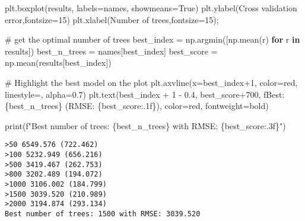 \documentclass[
  letterpaper,
  DIV=11,
  numbers=noendperiod]{scrreprt}
\newenvironment{Shaded}{\begin{snugshade}}{\end{snugshade}}
\newcommand{\BuiltInTok}[1]{\textcolor[rgb]{0.00,0.23,0.31}{#1}}
\newcommand{\CommentTok}[1]{\textcolor[rgb]{0.37,0.37,0.37}{#1}}
\newcommand{\ControlFlowTok}[1]{\textcolor[rgb]{0.00,0.23,0.31}{\textbf{#1}}}
\newcommand{\DecValTok}[1]{\textcolor[rgb]{0.68,0.00,0.00}{#1}}
\newcommand{\FloatTok}[1]{\textcolor[rgb]{0.68,0.00,0.00}{#1}}
\newcommand{\KeywordTok}[1]{\textcolor[rgb]{0.00,0.23,0.31}{\textbf{#1}}}
\newcommand{\NormalTok}[1]{\textcolor[rgb]{0.00,0.23,0.31}{#1}}
\newcommand{\OperatorTok}[1]{\textcolor[rgb]{0.37,0.37,0.37}{#1}}
\newcommand{\SpecialCharTok}[1]{\textcolor[rgb]{0.37,0.37,0.37}{#1}}
\newcommand{\SpecialStringTok}[1]{\textcolor[rgb]{0.13,0.47,0.30}{#1}}
\newcommand{\StringTok}[1]{\textcolor[rgb]{0.13,0.47,0.30}{#1}}
\newcommand{\VariableTok}[1]{\textcolor[rgb]{0.07,0.07,0.07}{#1}}
\begin{document}
\begin{Shaded}
\begin{Highlighting}[]
\NormalTok{plt.boxplot(results, labels}\OperatorTok{=}\NormalTok{names, showmeans}\OperatorTok{=}\VariableTok{True}\NormalTok{)}
\NormalTok{plt.ylabel(}\StringTok{\textquotesingle{}Cross validation error\textquotesingle{}}\NormalTok{,fontsize}\OperatorTok{=}\DecValTok{15}\NormalTok{)}
\NormalTok{plt.xlabel(}\StringTok{\textquotesingle{}Number of trees\textquotesingle{}}\NormalTok{,fontsize}\OperatorTok{=}\DecValTok{15}\NormalTok{)}\OperatorTok{;}

\CommentTok{\# get the optimal number of trees}
\NormalTok{best\_index }\OperatorTok{=}\NormalTok{ np.argmin([np.mean(r) }\ControlFlowTok{for}\NormalTok{ r }\KeywordTok{in}\NormalTok{ results])}
\NormalTok{best\_n\_trees }\OperatorTok{=}\NormalTok{ names[best\_index]}
\NormalTok{best\_score }\OperatorTok{=}\NormalTok{ np.mean(results[best\_index])}


\CommentTok{\# Highlight the best model on the plot}
\NormalTok{plt.axvline(x}\OperatorTok{=}\NormalTok{best\_index}\OperatorTok{+}\DecValTok{1}\NormalTok{, color}\OperatorTok{=}\StringTok{\textquotesingle{}red\textquotesingle{}}\NormalTok{, linestyle}\OperatorTok{=}\StringTok{\textquotesingle{}{-}{-}\textquotesingle{}}\NormalTok{, alpha}\OperatorTok{=}\FloatTok{0.7}\NormalTok{)}
\NormalTok{plt.text(best\_index }\OperatorTok{+} \DecValTok{1} \OperatorTok{{-}} \FloatTok{0.4}\NormalTok{, best\_score}\OperatorTok{+}\DecValTok{700}\NormalTok{, }
         \SpecialStringTok{f\textquotesingle{}Best: }\SpecialCharTok{\{}\NormalTok{best\_n\_trees}\SpecialCharTok{\}}\SpecialStringTok{ (RMSE: }\SpecialCharTok{\{}\NormalTok{best\_score}\SpecialCharTok{:.1f\}}\SpecialStringTok{)\textquotesingle{}}\NormalTok{, }
\NormalTok{         color}\OperatorTok{=}\StringTok{\textquotesingle{}red\textquotesingle{}}\NormalTok{, fontweight}\OperatorTok{=}\StringTok{\textquotesingle{}bold\textquotesingle{}}\NormalTok{)}

\BuiltInTok{print}\NormalTok{(}\SpecialStringTok{f"Best number of trees: }\SpecialCharTok{\{}\NormalTok{best\_n\_trees}\SpecialCharTok{\}}\SpecialStringTok{ with RMSE: }\SpecialCharTok{\{}\NormalTok{best\_score}\SpecialCharTok{:.3f\}}\SpecialStringTok{"}\NormalTok{)}
\end{Highlighting}
\end{Shaded}

\begin{verbatim}
>50 6549.576 (722.462)
>100 5232.949 (656.216)
>500 3419.467 (262.753)
>800 3202.489 (194.072)
>1000 3106.002 (184.799)
>1500 3039.520 (210.989)
>2000 3194.874 (293.134)
Best number of trees: 1500 with RMSE: 3039.520
\end{verbatim}
\end{document}
